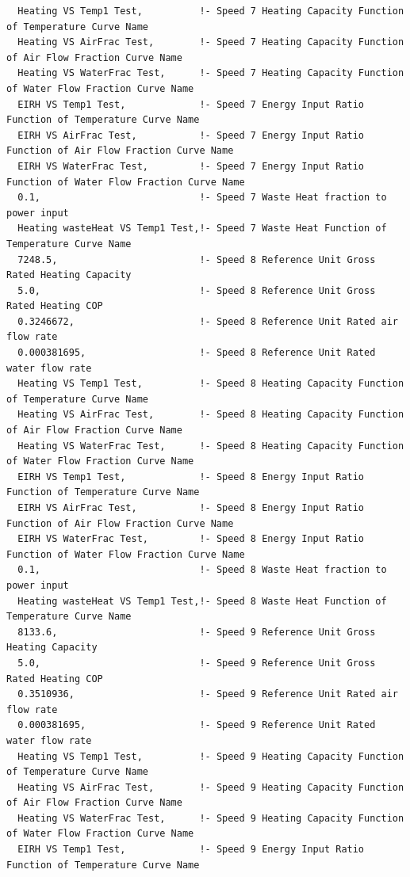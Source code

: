 \begin{lstlisting}
  Heating VS Temp1 Test,          !- Speed 7 Heating Capacity Function of Temperature Curve Name
  Heating VS AirFrac Test,        !- Speed 7 Heating Capacity Function of Air Flow Fraction Curve Name
  Heating VS WaterFrac Test,      !- Speed 7 Heating Capacity Function of Water Flow Fraction Curve Name
  EIRH VS Temp1 Test,             !- Speed 7 Energy Input Ratio Function of Temperature Curve Name
  EIRH VS AirFrac Test,           !- Speed 7 Energy Input Ratio Function of Air Flow Fraction Curve Name
  EIRH VS WaterFrac Test,         !- Speed 7 Energy Input Ratio Function of Water Flow Fraction Curve Name
  0.1,                            !- Speed 7 Waste Heat fraction to power input
  Heating wasteHeat VS Temp1 Test,!- Speed 7 Waste Heat Function of Temperature Curve Name
  7248.5,                         !- Speed 8 Reference Unit Gross Rated Heating Capacity
  5.0,                            !- Speed 8 Reference Unit Gross Rated Heating COP
  0.3246672,                      !- Speed 8 Reference Unit Rated air flow rate
  0.000381695,                    !- Speed 8 Reference Unit Rated water flow rate
  Heating VS Temp1 Test,          !- Speed 8 Heating Capacity Function of Temperature Curve Name
  Heating VS AirFrac Test,        !- Speed 8 Heating Capacity Function of Air Flow Fraction Curve Name
  Heating VS WaterFrac Test,      !- Speed 8 Heating Capacity Function of Water Flow Fraction Curve Name
  EIRH VS Temp1 Test,             !- Speed 8 Energy Input Ratio Function of Temperature Curve Name
  EIRH VS AirFrac Test,           !- Speed 8 Energy Input Ratio Function of Air Flow Fraction Curve Name
  EIRH VS WaterFrac Test,         !- Speed 8 Energy Input Ratio Function of Water Flow Fraction Curve Name
  0.1,                            !- Speed 8 Waste Heat fraction to power input
  Heating wasteHeat VS Temp1 Test,!- Speed 8 Waste Heat Function of Temperature Curve Name
  8133.6,                         !- Speed 9 Reference Unit Gross Heating Capacity
  5.0,                            !- Speed 9 Reference Unit Gross Rated Heating COP
  0.3510936,                      !- Speed 9 Reference Unit Rated air flow rate
  0.000381695,                    !- Speed 9 Reference Unit Rated water flow rate
  Heating VS Temp1 Test,          !- Speed 9 Heating Capacity Function of Temperature Curve Name
  Heating VS AirFrac Test,        !- Speed 9 Heating Capacity Function of Air Flow Fraction Curve Name
  Heating VS WaterFrac Test,      !- Speed 9 Heating Capacity Function of Water Flow Fraction Curve Name
  EIRH VS Temp1 Test,             !- Speed 9 Energy Input Ratio Function of Temperature Curve Name

\end{lstlisting}

